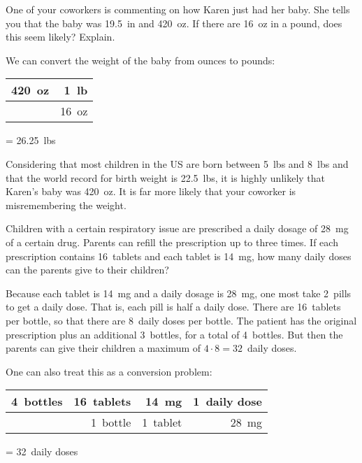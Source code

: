 \documentclass[11pt,letterpaper]{article}
\begin{document}
\newpage



 One of your coworkers is commenting on how Karen just had her baby. She tells you that the baby was 19.5~in and 420~oz. If there are 16~oz in a pound, does this seem likely? Explain. \pspace

\sol We can convert the weight of the baby from ounces to pounds: \par
	\begin{table}[!ht]
	\centering
	\begin{tabular}{r|r}
	420~oz & 1~lb \\ \hline
		    & 16~oz
	\end{tabular}
	= 26.25~lbs
	\end{table} \par
Considering that most children in the US are born between 5~lbs and 8~lbs and that the world record for birth weight is 22.5~lbs, it is highly unlikely that Karen's baby was 420~oz. It is far more likely that your coworker is misremembering the weight. 



\newpage



 Children with a certain respiratory issue are prescribed a daily dosage of 28~mg of a certain drug. Parents can refill the prescription up to three times. If each prescription contains 16~tablets and each tablet is 14~mg, how many daily doses can the parents give to their children? \pspace

\sol Because each tablet is 14~mg and a daily dosage is 28~mg, one most take 2~pills to get a daily dose. That is, each pill is half a daily dose. There are 16~tablets per bottle, so that there are 8~daily doses per bottle. The patient has the original prescription plus an additional 3~bottles, for a total of 4~bottles. But then the parents can give their children a maximum of $4 \cdot 8= 32$~daily doses. \pspace

One can also treat this as a conversion problem: \par
	\begin{table}[!ht]
	\centering
	\begin{tabular}{r|r|r|r}
	4~bottles  & 16~tablets & 14~mg    & 1~daily dose \\ \hline
			& 1~bottle     & 1~tablet  & 28~mg
	\end{tabular}
	= 32~daily doses
	\end{table} \par
\end{document}
